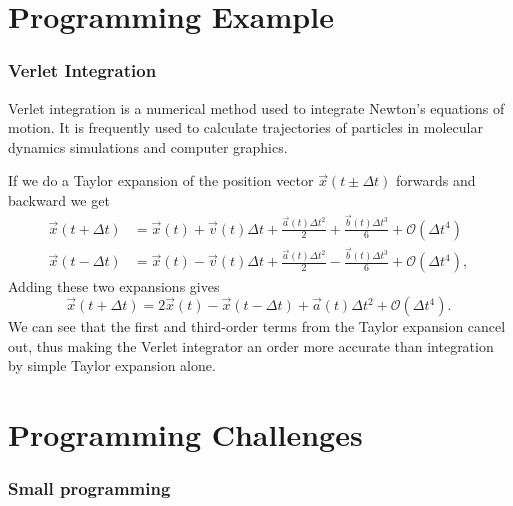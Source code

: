 \section[Example]{Programming Example}
\begin{frame}[allowframebreaks]
    \frametitle{Verlet Integration}
    
Verlet integration is a numerical method used to integrate Newton's equations of motion. It is frequently used to calculate trajectories of particles in molecular dynamics simulations and computer graphics.

If we do a Taylor expansion of the position vector $\vec{x}(t\pm\Delta t)$ forwards and backward we get
\begin{align*}
\vec{x}(t + \Delta t)
&= \vec{x}(t) + \vec{v}(t)\Delta t + \frac{\vec{a}(t) \Delta t^2}{2}
+ \frac{\vec{b}(t) \Delta t^3}{6} + \mathcal{O}(\Delta t^4)\\
\vec{x}(t - \Delta t)
&= \vec{x}(t) - \vec{v}(t)\Delta t + \frac{\vec{a}(t) \Delta t^2}{2}
- \frac{\vec{b}(t) \Delta t^3}{6} + \mathcal{O}(\Delta t^4), \,
\end{align*}
Adding these two expansions gives
\[\vec{x}(t + \Delta t) = 2\vec{x}(t) - \vec{x}(t - \Delta t) + \vec{a}(t) \Delta t^2 + \mathcal{O}(\Delta t^4).\,\]
We can see that the first and third-order terms from the Taylor expansion cancel out, thus making the Verlet integrator an order more accurate than integration by simple Taylor expansion alone.
    
\end{frame}

\section[Challenges]{Programming Challenges}
\begin{frame}
    \frametitle{Small programming}    
\end{frame}


\begin{frame}
    \frametitle{\large{}}
    \huge{\center{\color{RUBblau}{Thank you for your attention.}}}
\end{frame}


